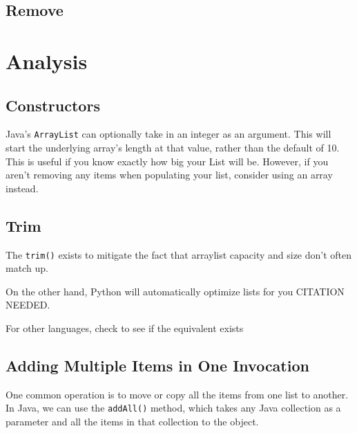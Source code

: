 \subsection{Remove}



\section{Analysis}





\subsection{Constructors}
Java's \texttt{ArrayList} can optionally take in an integer as an argument.
This will start the underlying array's length at that value, rather than the default of 10.
This is useful if you know exactly how big your List will be.  
However, if you aren't removing any items when populating your list, consider using an array instead.

\subsection{Trim}

The \texttt{trim()} exists to mitigate the fact that arraylist capacity and size don't often match up.



On the other hand, Python will automatically optimize lists for you CITATION NEEDED.

For other languages, check to see if the equivalent exists

\subsection{Adding Multiple Items in One Invocation}
One common operation is to move or copy all the items from one list to another.
In Java, we can use the \texttt{addAll()} method, which takes any Java collection as a parameter and all the items in that collection to the object.

